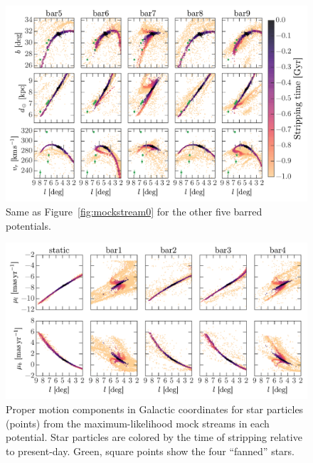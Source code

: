 \documentclass[letterpaper,12pt,preprint]{aastex}
\begin{document}
\begin{landscape}
\begin{figure}[p]
\begin{center}
\includegraphics[width=1.2\textwidth]{figures/mockstream1}
\caption{ Same as Figure~\ref{fig:mockstream0} for the other five barred potentials. }
\label{fig:mockstream1}
\end{center}
\end{figure}
\end{landscape}

\begin{landscape}
\begin{figure}[p]
\begin{center}
\includegraphics[width=1.2\textwidth]{figures/mockstream-pm0}
\caption{ Proper motion components in Galactic coordinates for star particles (points) from the maximum-likelihood mock streams in each potential. Star particles are colored by the time of stripping relative to present-day. Green, square points show the four ``fanned'' stars.}
\label{fig:mockstream-pm0}
\end{center}
\end{figure}
\end{landscape}
\end{document}
